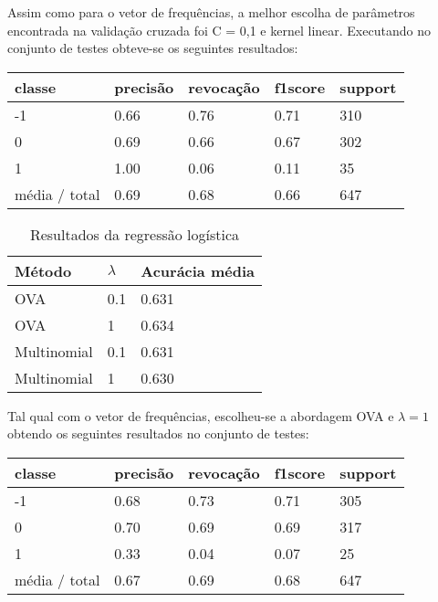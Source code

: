 Assim como para o vetor de frequências, a melhor escolha de parâmetros encontrada na validação
cruzada foi C = 0,1 e kernel linear. Executando no conjunto de testes obteve-se os seguintes
resultados:

\begin{table}[H]
	\centering
		\begin{tabular}{l | l | l | l | l}
		\hline
		classe  	&	precisão  &  revocação &  f1\-score &  support \\
		\hline
         -1    &   0.66   &   0.76  &    0.71    &   310 \\
         \hline
          0     &  0.69   &   0.66   &   0.67    &   302 \\
         \hline
          1     &  1.00  &    0.06   &   0.11    &    35 \\
		\hline
		média / total    &   0.69   &   0.68   &   0.66    &   647 \\
		\hline
	\end{tabular}
\end{table}

\begin{table}[H]
	\centering
	\caption{Resultados da regressão logística}
	\begin{tabular}{l l l}
		\hline
		Método & $\lambda$ & Acurácia média \\
		\hline
		OVA & 0.1 & 0.631 \\
		\hline
		OVA & 1 & 0.634 \\
		\hline
		Multinomial & 0.1 & 0.631 \\
		\hline
		Multinomial & 1 & 0.630 \\
		\hline
	\end{tabular}
\end{table}

Tal qual com o vetor de frequências, escolheu-se a abordagem OVA e $\lambda = 1$ obtendo os seguintes
resultados no conjunto de testes:

\begin{table}[H]
	\centering
		\begin{tabular}{l | l | l | l | l}
		\hline
		classe  	&	precisão  &  revocação &  f1\-score &  support \\
		\hline
		 -1    &   0.68   &   0.73  &    0.71   &    305 \\
		 \hline
          0    &   0.70   &   0.69   &   0.69   &    317 \\
          \hline
          1   &    0.33   &   0.04   &   0.07   &     25 \\
		 \hline
		média / total    &   0.67   &   0.69  &    0.68   &    647 \\
		\hline
	\end{tabular}
\end{table}

